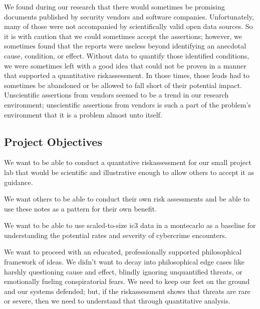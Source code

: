 We found during our research that there would sometimes be promising documents published by security vendors and software companies.  Unfortunately, many of those were not accompanied by scientifically valid open data sources.  So it is with caution that we could sometimes accept the assertions; however, we sometimes found that the reports were useless beyond identifying an anecdotal cause, condition, or effect.  Without data to quantify those identified conditions, we were sometimes left with a good idea that could not be proven in a manner that supported a quantitative \gls{riskassessment}.  In those times, those leads had to sometimes be abandoned or be allowed to fall short of their potential impact.  Unscientific assertions from vendors seemed to be a trend in our research environment; unscientific assertions from vendors is such a part of the problem's environment that it is a problem almost unto itself.

\subsection{Project Objectives}
We want to be able to conduct a quantative \gls{riskassessment} for our small project lab that would be scientific and illustrative enough to allow others to accept it as guidance.

We want others to be able to conduct their own risk assessments
and be able to use these notes as a pattern for their own benefit.

We want to be able to use scaled-to-size \gls{ic3} data in a \gls{montecarlo} as a baseline for understanding the potential rates and severity of \gls{cybercrime} encounters.

We want to proceed with an educated, professionally supported philosophical framework of ideas.  We didn't want to decay into philosophical edge cases like harshly questioning cause and effect, blindly ignoring unquantified threats, or emotionally fueling conspiratorial fears.  We need to keep our feet on the ground and our systems defended; but, if the \gls{riskassessment} shows that threats are rare or severe, then we need to understand that through quantitative analysis.


